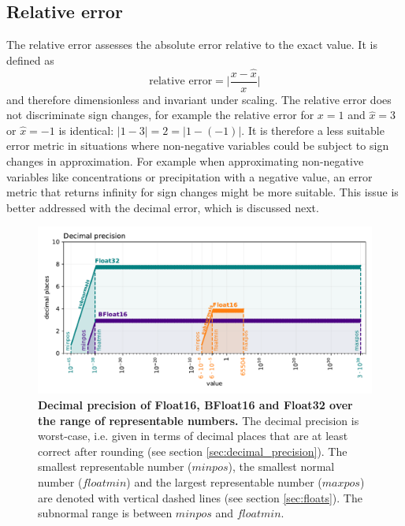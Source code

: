 \subsection{Relative error}
\label{sec:relative_error}

The relative error assesses the absolute error relative to the exact value. It is defined as
\begin{equation}
	\text{relative error} = \vert \frac{x - \hat{x}}{x} \vert
	\label{eq:relerror}
\end{equation}
and therefore dimensionless and invariant under scaling. The relative error does not discriminate sign changes, for example
the relative error for $x=1$ and $\hat{x} = 3$ or $\hat{x} = -1$ is identical: $\vert 1- 3 \vert = 2 = \vert 1 - (-1) \vert$. It is therefore
a less suitable error metric in situations where non-negative variables could be subject to sign changes in approximation.
For example when approximating non-negative variables like concentrations or precipitation with a negative value,
an error metric that returns infinity for sign changes might be more suitable. This issue is better addressed with
the decimal error, which is discussed next.

\begin{figure}[tbhp]
	\includegraphics[width=1\textwidth]{Figures/methods/float32_16_bfloat_decprec.pdf}
	\caption{\textbf{Decimal precision of Float16, BFloat16 and Float32 over the range of representable numbers.}
	The decimal precision is worst-case, i.e. given in terms of decimal places that are at least correct after rounding
	(see section \ref{sec:decimal_precision}). The smallest representable number ($minpos$), the smallest normal number
	($floatmin$) and the largest representable number ($maxpos$) are denoted with vertical dashed lines (see section \ref{sec:floats}).
	The subnormal range is between $minpos$ and $floatmin$.}
	\label{fig:methods_decprec_floats}
\end{figure}

